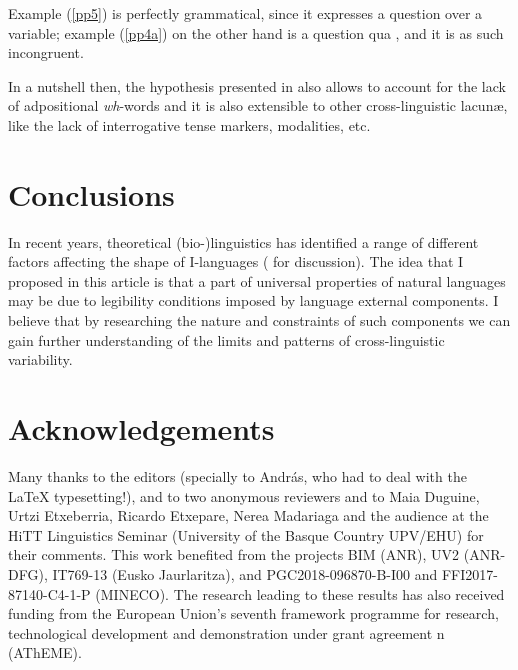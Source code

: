 \documentclass[output=paper]{langsci/langscibook}
\begin{document}
Example (\ref{pp5}) is perfectly grammatical, since it expresses a question
over a variable; example (\ref{pp4a}) on the other hand is a question
qua , and it is as such incongruent.

In a nutshell then, the hypothesis presented in  also allows to
account for the lack of adpositional \emph{wh}-words and it is also
extensible to other cross-linguistic lacun\ae, like the lack of interrogative
tense markers, modalities, etc.

\section{Conclusions}\largerpage

In recent years, theoretical (bio-)linguistics has identified a range of
different factors affecting the shape of I-languages
(\citealt{Chomsky2005,BerwickEtAl2011,Roberts2012} for discussion). The idea
that I proposed in this article is that a part of universal properties of
natural languages may be due to legibility conditions imposed by language
external components. I believe that by researching the nature and constraints of
such components we can gain further understanding of the limits and patterns of
cross-linguistic variability.

\printchapterglossary{}

\section*{Acknowledgements}

Many thanks to the editors (specially to András, who had to deal with the
\LaTeX{} typesetting!), and to two anonymous reviewers and to Maia Duguine,
Urtzi Etxeberria, Ricardo Etxepare, Nerea Madariaga and the audience at the
HiTT Linguistics Seminar (University of the Basque Country UPV/EHU) for their
comments. This work benefited from the projects BIM (ANR), UV2 (ANR-DFG),
IT769-13 (Eusko Jaurlaritza), and PGC2018-096870-B-I00 and FFI2017-87140-C4-1-P
(MI\-NE\-CO). The research leading to these results has also received funding from
the European Union’s seventh framework programme for research, technological
development and demonstration under grant agreement n
(AThEME).

{\sloppy
\printbibliography[heading=subbibliography,notkeyword=this]
}
\end{document}
